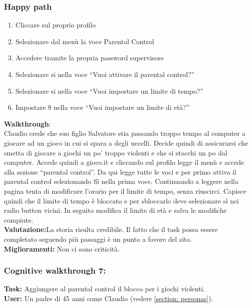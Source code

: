 \documentclass[../Report.tex]{subfiles}
\begin{document}
    \subsubsection{Happy path}
    \begin{enumerate}
        \item Cliccare sul proprio profilo
        \item Selezionare dal menù la voce Parental Control
        \item Accedere tramite la propria password supervisore
        \item         Selezionare si nella voce “Vuoi attivare il parental control?”
        \item Selezionare si nella voce “Vuoi impostare un limite di tempo?”
        \item Impostare 8 nella voce “Vuoi impostare un limite di età?”
    \end{enumerate}
    \textbf{Walkthrough}:\\
    Claudio crede che suo figlio Salvatore stia passando troppo tempo al computer a giocare ad un gioco in cui si spara a degli uccelli. Decide quindi di assicurarsi che smetta di giocare a giochi un po’ troppo violenti e che si stacchi un po dal computer. Accede quindi a gioco.it e cliccando sul profilo legge il menù e accede alla sezione “parental control”. Da qui legge tutte le voci e per primo attiva il parental control selezionando Sì nella prima voce. Continuando a leggere nella pagina tenta di modificare l’orario per il limite di tempo, senza riuscirci. Capisce quindi che il limite di tempo è bloccato e per sbloccarlo deve selezionare sì nei radio button vicini. In seguito modifica il limite di età e salva le modifiche compiute. \\ 


    \textbf{Valutazione:}La storia risulta credibile. Il fatto che il task possa essere completato seguendo più passaggi è un punto a favore del sito.\\

    \textbf{Miglioramenti:} Non ci sono criticità.

    \subsubsection{Cognitive walkthrough 7:}
    \textbf{Task:} Aggiungere al parental control il blocco per i giochi violenti.\\
    \textbf{User:} Un padre di 45 anni come Claudio (vedere \ref{section: personas}).\\
\end{document}
